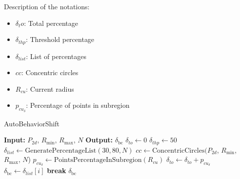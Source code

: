 Description of the notations:
\begin{multicols}{2}
    \begin{itemize}[noitemsep,topsep=0pt]
        \item $\delta_to$: Total percentage
        \item $\delta_{thp}$: Threshold percentage
        \item $\delta_{list}$: List of percentages
        \item $cc$: Concentric circles
        \item $R_{cu}$: Current radius
        \item $p_{cu_\delta}$: Percentage of points in subregion
    \end{itemize}
\end{multicols}

\begin{algorithm}[H]
    \caption{AutoBehaviorShift}
    \label{alg:autobehaviorshift}
    \begin{algorithmic}[1]
    \Statex \textbf{Input: }  $P_{2d}$, $R_{\text{min}}$, $R_{\text{max}}$, $N$ 
    \Statex \textbf{Output: } $\delta_{\text{bc}}$ 
    \newline
    \State $\delta_{to} \leftarrow 0$ 
    \State $\delta_{thp} \leftarrow 50$ 
    \State $\delta_{list} \leftarrow \text{GeneratePercentageList}(30, 80, N)$ 
    \State $cc \leftarrow \text{ConcentricCircles}(P_{2d}$, $R_{\text{min}}$, $R_{\text{max}}$, $N$)
        \State $p_{cu_\delta} \leftarrow \text{PointsPercentageInSubregion}(R_{cu})$
        \State $\delta_{to} \leftarrow \delta_{to} + p_{cu_\delta}$
            \State $\delta_{\text{bc}} \leftarrow \delta_{list}[i]$
            \State \textbf{break}
        \EndIf
    \EndFor
    \State \Return $\delta_{\text{bc}}$
    \end{algorithmic}
    \end{algorithm}
    

    
    
    
    



